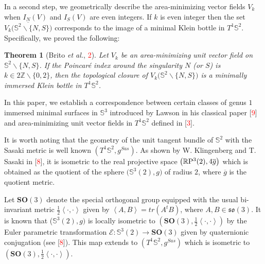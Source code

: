 \documentclass[reqno,11pt]{amsart}
\newtheorem{theorem}{Theorem}
\begin{document}
In a second step, we geometrically describe the area-minimizing vector fields $V_k$ when $I_N(V)$ and $I_S(V)$ are even integers. If $k$ is even integer then the set $\overline{V_k \big(\mathbb{S}^2\backslash\{N,S\}\big)}$ corresponds to the image of a minimal Klein bottle in $T^1\mathbb{S}^2$. Specifically, we proved the following: 

\begin{theorem}[Brito \textit{et al.}, \textcolor{red}{2}] \label{Thm:GKlein}
Let $V_k$ be an area-minimizing unit vector field on $\mathbb{S}^2\backslash\{N,S\}$. If the Poincaré index around the singularity $N$ (or $S$) is $k \in 2\mathbb{Z}\backslash\{0, 2\}$, then the topological closure of $V_k \big(\mathbb{S}^2\backslash\{N,S\}\big)$ is a minimally immersed Klein bottle in $T^1\mathbb{S}^2$.
\end{theorem}

In this paper, we establish a correspondence between certain classes of genus $1$ immersed minimal surfaces in $\mathbb{S}^3$ introduced by Lawson in his classical paper [\textcolor{red}{9}] and area-minimizing unit vector fields in $T^1\mathbb{S}^2$ defined in [\textcolor{red}{3}].

It is worth noting that the geometry of the unit tangent bundle of $\mathbb{S}^2$ with the Sasaki metric is well known $(T^1\mathbb{S}^2, g^{Sas})$.  As shown by W. Klingenberg and T. Sasaki in [\textcolor{red}{8}], it is isometric to the real projective space $\left(\mathbb{R}{\rm{P}}^3(2), 4\overline{g}\right)$ which is obtained as the quotient of the sphere $\big(\mathbb{S}^3(2), g\big)$ of radius $2$, where $\overline{g}$ is the quotient metric. %

Let $\mathbf{SO}(3)$ denote the special orthogonal group equipped with the usual bi-invariant metric $\frac{1}{2}\left\langle\cdot ,\cdot \right\rangle$ given by
$\left\langle A,B \right\rangle = tr(A^{t}B)$, where $A,B \in \mathfrak{so}(3)$. 
 It is known that ($\mathbb{S}^3(2),g)$ is locally isometric to $\left(\mathbf{SO}(3), \frac{1}{2}\left\langle\cdot ,\cdot \right\rangle\right)$ by the Euler parametric transformation $\mathcal{E}: \mathbb{S}^3(2) \rightarrow \mathbf{SO}(3)$ given by quaternionic conjugation (see [\textcolor{red}{8}]). %
This map extends to $(T^1\mathbb{S}^2, g^{Sas})$ which is isometric to $\left(\mathbf{SO}(3), \frac{1}{2}\left\langle\cdot ,\cdot \right\rangle\right)$. 
\end{document}
